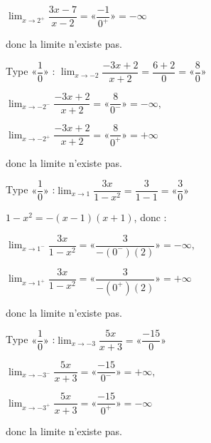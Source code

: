 {\begin{tasks}
  $\displaystyle \lim_{x \to 2^+} \dfrac{3x - 7}{x - 2}= «\dfrac{-1}{0^+}» = -\infty$

  donc la limite n’existe pas.

  \task   Type \(« \dfrac{1}{0} »\) : \( \displaystyle \lim_{x \to -2} \dfrac{-3x + 2}{x + 2}
  = \dfrac{6 + 2}{0} = «\dfrac{8}{0}» \)

  $
   \displaystyle \lim_{x \to -2^-} \dfrac{-3x + 2}{x + 2}
= «\dfrac{8}{0^-}» = -\infty,$

$\displaystyle \lim_{x \to -2^+} \dfrac{-3x + 2}{x + 2}
= «\dfrac{8}{0^+}» = +\infty
$

  donc la limite n’existe pas.

  \task Type \(« \dfrac{1}{0} »\) :\( \displaystyle \lim_{x \to 1} \dfrac{3x}{1 - x^2}
  = \dfrac{3}{1 - 1} = «\dfrac{3}{0}» \)

  \( 1 - x^2 = -(x - 1)(x + 1) \), donc :
 
  $
   \displaystyle \lim_{x \to 1^-} \dfrac{3x}{1 - x^2} = «\dfrac{3}{-(0^-)(2)}» = -\infty,$
  
   $\displaystyle \lim_{x \to 1^+}  \dfrac{3x}{1 - x^2}= «\dfrac{3}{-(0^+)(2)}» = +\infty$

  donc la limite n'existe pas. 

  \task Type \(« \dfrac{1}{0} »\) :\( \displaystyle \lim_{x \to -3} \dfrac{5x}{x + 3} = «\dfrac{-15}{0}» \)

$  \displaystyle \lim_{x \to -3^-}\dfrac{5x}{x + 3}= «\dfrac{-15}{0^-} »= +\infty,$

 $\displaystyle \lim_{x \to -3^+} \dfrac{5x}{x + 3}= «\dfrac{-15}{0^+}» = -\infty$

  donc la limite n’existe pas.
\end{tasks}
}

